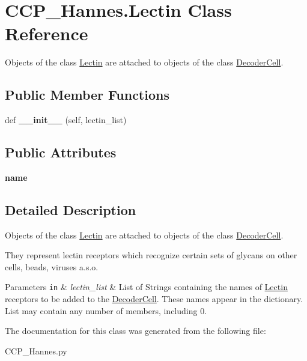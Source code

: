 \hypertarget{class_c_c_p___hannes_1_1_lectin}{}\section{C\+C\+P\+\_\+\+Hannes.\+Lectin Class Reference}
\label{class_c_c_p___hannes_1_1_lectin}


Objects of the class \mbox{\hyperlink{class_c_c_p___hannes_1_1_lectin}{Lectin}} are attached to objects of the class \mbox{\hyperlink{class_c_c_p___hannes_1_1_decoder_cell}{Decoder\+Cell}}.  


\subsection*{Public Member Functions}
\begin{DoxyCompactItemize}
\item 
\mbox{\label{class_c_c_p___hannes_1_1_lectin_ad0b481fc5f873f2e601b5d087c0d97a4}} 
def {\bfseries \+\_\+\+\_\+init\+\_\+\+\_\+} (self, lectin\+\_\+list)
\end{DoxyCompactItemize}
\subsection*{Public Attributes}
\begin{DoxyCompactItemize}
\item 
\mbox{\label{class_c_c_p___hannes_1_1_lectin_ac681f373d9d37dfb0e66def9db71757c}} 
{\bfseries name}
\end{DoxyCompactItemize}


\subsection{Detailed Description}
Objects of the class \mbox{\hyperlink{class_c_c_p___hannes_1_1_lectin}{Lectin}} are attached to objects of the class \mbox{\hyperlink{class_c_c_p___hannes_1_1_decoder_cell}{Decoder\+Cell}}. 

They represent lectin receptors which recognize certain sets of glycans on other cells, beads, viruses a.\+s.\+o.


\begin{DoxyParams}[1]{Parameters}
\mbox{\tt in}  & {\em lectin\+\_\+list} & List of Strings containing the names of \mbox{\hyperlink{class_c_c_p___hannes_1_1_lectin}{Lectin}} receptors to be added to the \mbox{\hyperlink{class_c_c_p___hannes_1_1_decoder_cell}{Decoder\+Cell}}. These names appear in the dictionary. List may contain any number of members, including 0. \\
\hline
\end{DoxyParams}


The documentation for this class was generated from the following file\+:\begin{DoxyCompactItemize}
\item 
C\+C\+P\+\_\+\+Hannes.\+py\end{DoxyCompactItemize}
